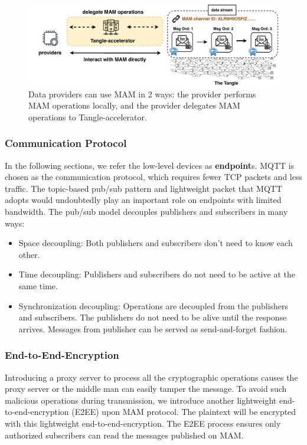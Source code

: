 \documentclass[conference]{IEEEtran}
\begin{document}
\begin{figure}[!t]
    \centering
    \includegraphics[width=\linewidth]{delegation}
    \caption{Data providers can use MAM in 2 ways: the provider performs MAM operations locally, and the provider delegates MAM operations to Tangle-accelerator.}
    \label{fig:delegation}
\end{figure}


\subsubsection{Communication Protocol}
In the following sections, we refer the low-level devices as \textbf{endpoint}s. MQTT\cite{MQTT} is chosen as the communication protocol, which requires fewer TCP packets and less traffic. The topic-based pub/sub pattern and lightweight packet that MQTT adopts would undoubtedly play an important role on endpoints with limited bandwidth. The pub/sub model decouples publishers and subscribers in many ways:

\begin{itemize}
    \item Space decoupling: Both publishers and subscribers don't need to know each other.
    \item Time decoupling: Publishers and subscribers do not need to be active at the same time.
    \item Synchronization decoupling: Operations are decoupled from the publishers and subscribers. The publishers do not need to be alive until the response arrives. Messages from publisher can be served as send-and-forget fashion.
\end{itemize}

\subsubsection{End-to-End-Encryption}
Introducing a proxy server to process all the cryptographic operations causes the proxy server or the middle man can easily tamper the message. To avoid such malicious operations during transmission, we introduce another lightweight end-to-end-encryption (E2EE) upon MAM protocol. The plaintext will be encrypted with this lightweight end-to-end-encryption. The E2EE process ensures only authorized subscribers can read the messages published on MAM.
\end{document}
